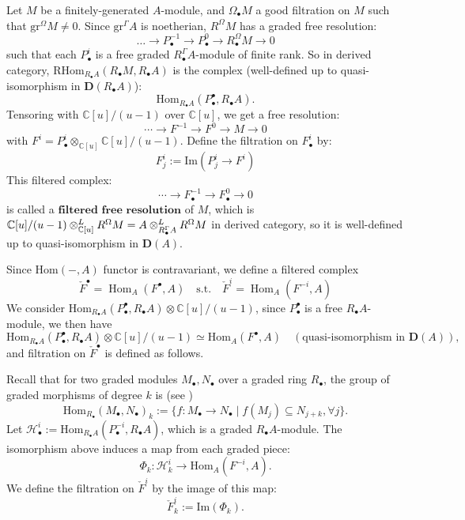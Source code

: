 Let $M$ be a finitely-generated $A$-module, and $\Omega_{\bullet}M$ a good filtration on $M$ such that $\mathrm{gr}^{\Omega} M \neq 0$.
Since $\mathrm{gr}^{\Gamma} A$ is noetherian, $R^{\Omega} M$ has a graded free resolution:
$$ \dots\rightarrow P_{\bullet}^{-1}\rightarrow P^{0}_{\bullet}\rightarrow R^{\Omega} _{\bullet}M\rightarrow0$$
such that each $P^{i}_{\bullet}$ is a free graded $R_{\bullet}^{\Gamma}A$-module of finite rank.
So in derived category, $\mathrm{RHom}_{R_{\bullet}A}(R_{\bullet}M, R_{\bullet}A)$ is the complex \cite[\href{https://stacks.math.columbia.edu/tag/0A8H}{Tag 0A8H}, \href{https://stacks.math.columbia.edu/tag/0A66}{Tag 0A66}]{stacks-project} (well-defined up to quasi-isomorphism in $\mathbf{D}(R_{\bullet}A)$):
$$\mathrm{Hom}_{R_{\bullet}A}(P^{\bullet}_{\bullet}, R_{\bullet}A).$$
Tensoring with $\mathbb{C}[u]/(u-1)$ over $\mathbb{C}[u]$, we get a free resolution:
$$ \cdots \to F^{-1} \to F^0 \to M \to 0$$
with $F^i = P^i_{\bullet} \otimes_{\mathbb{C}[u]} \mathbb{C}[u]/(u-1)$.
Define the filtration on $F^i_{\bullet}$ by:$$F_j^i := \mathrm{Im}(P_j^i \longrightarrow F^i)$$
This filtered complex:
$$\cdots \longrightarrow F_{\bullet}^{-1} \longrightarrow F_{\bullet}^0 \longrightarrow 0$$
is called a $\textbf{filtered free resolution}$ of $M$, which is $\mathbb{C}[u]/(u-1)\otimes^{L}_{\mathbb{C}[u]} R^{\Omega}M = A\otimes^{L}_{R_{\bullet}^{\Gamma}A} R^{\Omega}M$ in derived category, \cite[\href{https://stacks.math.columbia.edu/tag/0FNB}{Tag 0FNB}, \href{https://stacks.math.columbia.edu/tag/064M}{Tag 064M}]{stacks-project}
so it is well-defined up to quasi-isomorphism in $\mathbf{D}(A)$.

\bigskip

Since $\mathrm{Hom}({-},A)$ functor is contravariant, we define a filtered complex $$ \check{F}^{\bullet} = \operatorname{Hom}_{A}(F^{\bullet}, A) \quad \mathrm{s.t.}\quad \check{F}^{i} = \operatorname{Hom}_{A}(F^{-i}, A) $$
We consider $\mathrm{Hom}_{R_{\bullet}A}(P^{\bullet}_{\bullet},R_{\bullet}A)\otimes \mathbb{C}[u] /(u-1)$,
since $P^\bullet_{\bullet}$ is a free $R_{\bullet}A$-module,
we then have
$$\mathrm{Hom}_{R_{\bullet}A}(P^\bullet_{\bullet},R_{\bullet}A)\otimes \mathbb{C}[u]/(u-1)\simeq \mathrm{Hom}_{A}(F^{\bullet},A) \quad (\text{quasi-isomorphism in } \mathbf{D}(A)),$$
and filtration on $\check{F}^{\bullet}$ is defined as follows.

Recall that for two graded modules $M_{\bullet}, N_{\bullet}$ over a graded ring $R_{\bullet}$, the group of graded morphisms of degree $k$ is
(see \cite[\href{https://stacks.math.columbia.edu/tag/09MN}{Tag 09MN}]{stacks-project})
$$\mathrm{Hom}_{R_{\bullet}}(M_{\bullet}, N_{\bullet})_k := \{ f: M_{\bullet} \to N_{\bullet} \mid f(M_j) \subseteq N_{j+k}, \forall j \}.$$
Let $\mathcal{H}^i_{\bullet} := \mathrm{Hom}_{R_{\bullet}A}(P^{-i}_{\bullet}, R_{\bullet}A)$, which is a graded $R_{\bullet}A$-module. The isomorphism above induces a map from each graded piece:
$$ \Phi_k: \mathcal{H}^i_k \longrightarrow \mathrm{Hom}_A(F^{-i}, A). $$
We define the filtration on $\check{F}^i$ by the image of this map:
$$ \check{F}^i_k := \mathrm{Im}(\Phi_k). $$

